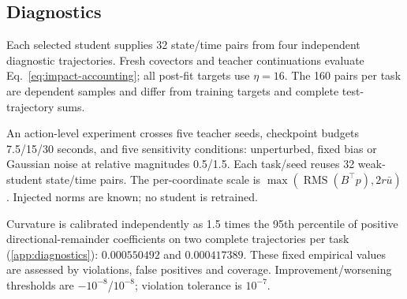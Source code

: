 \subsection{Diagnostics}
Each selected student supplies 32 state/time pairs from four independent
diagnostic trajectories. Fresh covectors and teacher continuations
evaluate Eq.~\eqref{eq:impact-accounting}; all post-fit targets use
$\eta=16$. The 160 pairs per task are dependent samples and differ
from training targets and complete test-trajectory sums.

An action-level experiment crosses five teacher seeds, checkpoint
budgets 7.5/15/30 seconds, and five sensitivity conditions: unperturbed,
fixed bias or Gaussian noise at relative magnitudes 0.5/1.5. Each
task/seed reuses 32 weak-student state/time pairs. The per-coordinate
scale is $\max(\operatorname{RMS}(B^\top p),2r\bar u)$. Injected norms
are known; no student is retrained.

Curvature is calibrated independently as 1.5 times the 95th percentile
of positive directional-remainder coefficients on two complete
trajectories per task (\ref{app:diagnostics}): $0.000550492$ and
$0.000417389$. These fixed empirical values are assessed by violations,
false positives and coverage. Improvement/worsening thresholds are
$-10^{-8}$/$10^{-8}$; violation tolerance is $10^{-7}$.
